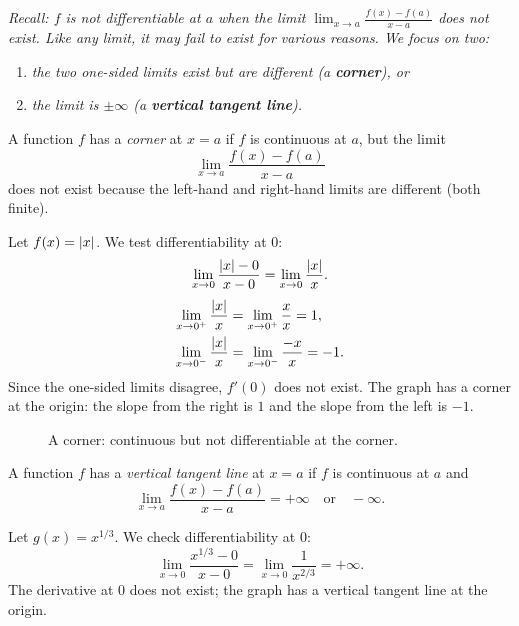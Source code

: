 \textit{Recall: $f$ is not differentiable at $a$ when the limit $\lim_{x \to a}\frac{f(x)-f(a)}{x-a}$ does not exist.  Like any limit, it may fail to exist for various reasons.  We focus on two:}
\begin{enumerate}[label=(\roman*)]
  \item \textit{the two one-sided limits exist but are different (a \textbf{corner}), or}
  \item \textit{the limit is $\pm\infty$ (a \textbf{vertical tangent line}).}
\end{enumerate}

\begin{definition}[Corner]
\label{def:3-8}
A function $f$ has a \emph{corner} at $x = a$ if $f$ is continuous at $a$, but the limit
\[
  \lim_{x \to a} \dfrac{f(x) - f(a)}{x - a}
\]
does not exist because the left-hand and right-hand limits are different (both finite).
\end{definition}

\begin{example}
\label{ex:3-7}
Let $f(x) = \left\lvert x \right\rvert$.  We test differentiability at $0$:
\[
  \lim_{x \to 0} \dfrac{\left\lvert x \right\rvert - 0}{x - 0} = \lim_{x \to 0} \dfrac{\left\lvert x \right\rvert}{x}.
\]
\begin{align*}
  \lim_{x \to 0^{+}} \dfrac{\left\lvert x \right\rvert}{x} &= \lim_{x \to 0^{+}} \dfrac{x}{x} = 1, \\
  \lim_{x \to 0^{-}} \dfrac{\left\lvert x \right\rvert}{x} &= \lim_{x \to 0^{-}} \dfrac{-x}{x} = -1.
\end{align*}
Since the one-sided limits disagree, $f'(0)$ does not exist.  The graph has a corner at the origin: the slope from the right is $1$ and the slope from the left is $-1$.
\end{example}

\begin{figure}[ht]
  \centering
  
  \caption{A corner: continuous but not differentiable at the corner.}
  \label{fig:cusp-abs}
\end{figure}

\begin{definition}
\label{def:3-9}
A function $f$ has a \emph{vertical tangent line} at $x = a$ if $f$ is continuous at $a$ and
\[
  \lim_{x \to a} \dfrac{f(x) - f(a)}{x - a} = +\infty \quad\text{or}\quad -\infty.
\]
\end{definition}

\begin{example}
\label{ex:3-8}
Let $g(x) = x^{1/3}$.  We check differentiability at $0$:
\[
  \lim_{x \to 0} \dfrac{x^{1/3} - 0}{x - 0} = \lim_{x \to 0} \dfrac{1}{x^{2/3}} = +\infty.
\]
The derivative at $0$ does not exist; the graph has a vertical tangent line at the origin.
\end{example}

